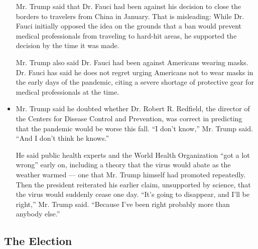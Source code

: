 \begin{itemize}
  Mr. Trump said that Dr. Fauci had been against his decision to close
  the borders to travelers from China in January. That is misleading:
  While Dr. Fauci initially opposed the idea on the grounds that a ban
  would prevent medical professionals from traveling to hard-hit areas,
  he supported the decision by the time it was made.

  Mr. Trump also said Dr. Fauci had been against Americans wearing
  masks. Dr. Fauci has said he does not regret urging Americans not to
  wear masks in the early days of the pandemic, citing a severe shortage
  of protective gear for medical professionals at the time.
\item
  Mr. Trump said he doubted whether Dr. Robert R. Redfield, the director
  of the Centers for Disease Control and Prevention, was correct in
  predicting that the pandemic would be worse this fall. ``I don't
  know,'' Mr. Trump said. ``And I don't think he knows.''

  He said public health experts and the World Health Organization ``got
  a lot wrong'' early on, including a theory that the virus would abate
  as the weather warmed --- one that Mr. Trump himself had promoted
  repeatedly. Then the president reiterated his earlier claim,
  unsupported by science, that the virus would suddenly cease one day.
  ``It's going to disappear, and I'll be right,'' Mr. Trump said.
  ``Because I've been right probably more than anybody else.''
\end{itemize}

\hypertarget{the-election}{%
\subsection{The Election}\label{the-election}}

